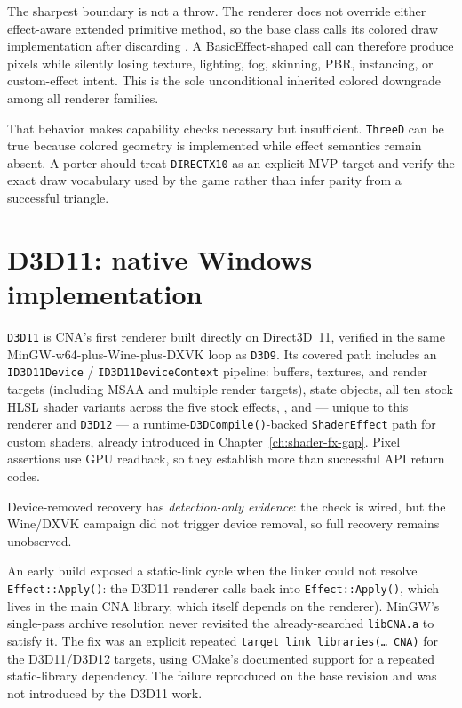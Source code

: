 The sharpest boundary is not a throw. The renderer does not override either effect-aware
extended primitive method, so the base class calls its colored draw implementation after
discarding .  A BasicEffect-shaped call can therefore produce pixels
while silently losing texture, lighting, fog, skinning, PBR, instancing, or custom-effect
intent. This is the sole unconditional inherited colored downgrade among all
\RendererFamilyCount{} renderer
families.

That behavior makes capability checks necessary but insufficient. \texttt{ThreeD} can be true
because colored geometry is implemented while effect semantics remain absent. A porter should
treat \texttt{DIRECTX10} as an explicit MVP target and verify the exact draw vocabulary used by
the game rather than infer parity from a successful triangle.

\section{D3D11: native Windows implementation}

\texttt{D3D11} is CNA's first renderer built directly on Direct3D~11, verified in the
same MinGW-w64-plus-Wine-plus-DXVK loop as \texttt{D3D9}. Its covered path includes an
\texttt{ID3D11Device} / \texttt{ID3D11DeviceContext} pipeline: buffers, textures, and render
targets (including MSAA and multiple render targets), state objects, all ten stock HLSL
shader variants across the five stock effects, , and --- unique
to this renderer and \texttt{D3D12} --- a runtime-\texttt{D3DCompile()}-backed
\texttt{ShaderEffect} path for custom shaders, already introduced in
Chapter~\ref{ch:shader-fx-gap}. Pixel assertions use GPU readback, so they establish more than
successful API return codes.

Device-removed recovery has \emph{detection-only evidence}: the check is wired, but the
Wine/DXVK campaign did not trigger device removal, so full recovery remains unobserved.

An early build exposed a static-link cycle when the linker could not resolve
\texttt{Effect::Apply()}: the D3D11 
renderer calls back into \texttt{Effect::Apply()}, which lives in the main CNA library, which
itself depends on the renderer). MinGW's single-pass archive resolution never revisited the
already-searched \texttt{libCNA.a} to satisfy it. The fix was an explicit repeated
\texttt{target\_link\_libraries(\ldots{} CNA)} for the D3D11/D3D12 targets, using CMake's
documented support for a repeated static-library dependency. The failure reproduced on the base
revision and was not introduced by the D3D11 work.

